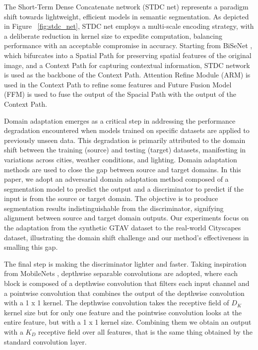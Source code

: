 \documentclass[conference]{IEEEtran}
\begin{document}
The Short-Term Dense Concatenate network (STDC net) \cite{b1} represents a paradigm shift towards lightweight, efficient models in semantic segmentation. As depicted in Figure ~\ref{fig:stdc_net}, STDC net employs a multi-scale encoding strategy, with a deliberate reduction in kernel size to expedite computation, balancing performance with an acceptable compromise in accuracy. Starting from BiSeNet \cite{b2}, which bifurcates into a Spatial Path for preserving spatial features of the original image, and a Context Path for capturing contextual information, STDC network is used as the backbone of the Context Path. Attention Refine Module (ARM) is used in the Context Path to refine some features and Future Fusion Model (FFM) is used to fuse the output of the Spacial Path with the output of the Context Path.

Domain adaptation emerges as a critical step in addressing the performance degradation encountered when models trained on specific datasets are applied to previously unseen data. This degradation is primarily attributed to the domain shift between the training (source) and testing (target) datasets, manifesting in variations across cities, weather conditions, and lighting. Domain adaptation methods are used to close the gap between source and target domains. In this paper, we adopt an adversarial domain adaptation method \cite{b3} composed of a segmentation model to predict the output and a discriminator to predict if the input is from the source or target domain. The objective is to produce segmentation results indistinguishable from the discriminator, signifying alignment between source and target domain outputs. Our experiments focus on the adaptation from the synthetic GTAV \cite{b4} dataset to the real-world Cityscapes \cite{b5} dataset, illustrating the domain shift challenge and our method's effectiveness in smalling this gap.

The final step is making the discriminator lighter and faster. Taking inspiration from MobileNets \cite{b6}, depthwise separable convolutions are adopted, where each block is composed of a depthwise convolution that filters each input channel and a pointwise convolution that combines the output of the depthwise convolution with a 1 x 1 kernel. The depthwise convolution takes the receptive field of \(D_K\) kernel size but for only one feature and the pointwise convolution looks at the entire feature, but with a 1 x 1 kernel size. Combining them we obtain an output with a \(K_D\) receptive field over all features, that is the same thing obtained by the standard convolution layer.
\end{document}
